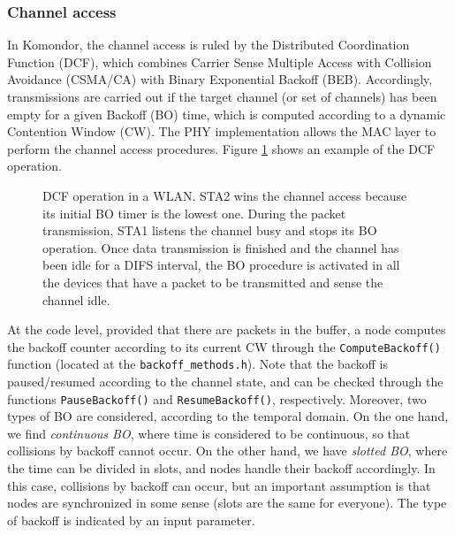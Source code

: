 \documentclass[a4paper]{article}
\begin{document}
	\subsubsection{Channel access}
	In Komondor, the channel access is ruled by the Distributed Coordination Function (DCF), which combines Carrier Sense Multiple Access with Collision Avoidance (CSMA/CA) with Binary Exponential Backoff (BEB). Accordingly, transmissions are carried out if the target channel (or set of channels) has been empty for a given Backoff (BO) time, which is computed according to a dynamic Contention Window (CW). The PHY implementation allows the MAC layer to perform the channel access procedures. Figure \ref{fig:dcf_operation} shows an example of the DCF operation. 
	\begin{figure}[h!]
		\centering
		\caption{DCF operation in a WLAN. STA2 wins the channel access because its initial BO timer is the lowest one. During the packet transmission, STA1 listens the channel busy and stops its BO operation. Once data transmission is finished and the channel has been idle for a DIFS interval, the BO procedure is activated in all the devices that have a packet to be transmitted and sense the channel idle.}
		\label{fig:dcf_operation}
	\end{figure}
	
	At the code level, provided that there are packets in the buffer, a node computes the backoff counter according to its current CW through the \texttt{ComputeBackoff()} function (located at the \texttt{backoff\_methods.h}). Note that the backoff is paused/resumed according to the channel state, and can be checked through the functions \texttt{PauseBackoff()} and \texttt{ResumeBackoff()}, respectively. Moreover, two types of BO are considered, according to the temporal domain. On the one hand, we find \textit{continuous BO}, where time is considered to be continuous, so that collisions by backoff cannot occur. On the other hand, we have \textit{slotted BO}, where the time can be divided in slots, and nodes handle their backoff accordingly. In this case, collisions by backoff can occur, but an important assumption is that nodes are synchronized in some sense (slots are the same for everyone). The type of backoff is indicated by an input parameter.
	
\end{document}
